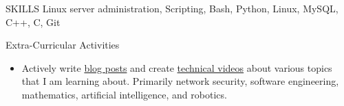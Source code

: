 \documentclass{resume} %
\begin{document}
    \begin{rSection}{SKILLS}
        Linux server administration, Scripting, Bash, Python, Linux, MySQL, C++, C, Git
    \end{rSection}

    \begin{rSection}{Extra-Curricular Activities} 
        \begin{itemize}
            \item Actively write \href{https://gutibran.com/blog}{blog posts} and create \href{https://youtube.com/@gutibran}{technical videos} about various topics that I am learning about. Primarily network security, software engineering, mathematics, artificial intelligence, and robotics.
        \end{itemize}
    \end{rSection}

\end{document}
